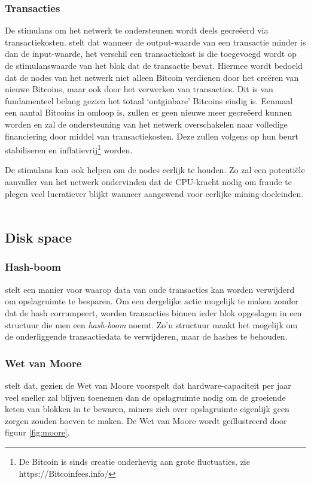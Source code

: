 		\subsubsection{Transacties}
		De stimulans om het netwerk te ondersteunen wordt deels gecreëerd via transactiekosten. \textcite{Nakamoto2008} stelt dat wanneer de output-waarde van een transactie minder is dan de input-waarde, het verschil een transactiekost is die toegevoegd wordt op de stimulanswaarde van het blok dat de transactie bevat. Hiermee wordt bedoeld dat de nodes van het netwerk niet alleen Bitcoin verdienen door het creëren van nieuwe Bitcoins, maar ook door het verwerken van transacties. Dit is van fundamenteel belang gezien het totaal ‘ontginbare’ Bitcoins eindig is. Eenmaal een aantal Bitcoins in omloop is, zullen er geen nieuwe meer gecreëerd kunnen worden en zal de ondersteuning van het netwerk overschakelen naar volledige financiering door middel van transactiekosten. Deze zullen volgens \textcite{Nakamoto2008} op hun beurt stabiliseren en inflatievrij\footnote{De Bitcoin is sinds creatie onderhevig aan grote fluctuaties, zie https://Bitcoinfees.info/} worden.
		
		De stimulans kan ook helpen om de nodes eerlijk te houden. Zo zal een potentiële aanvaller van het netwerk ondervinden dat de CPU-kracht nodig om fraude te plegen veel lucratiever blijkt wanneer aangewend voor eerlijke mining-doeleinden. ~\autocite{Nakamoto2008}
		
	\subsection{Disk space}
		\subsubsection{Hash-boom}
		\textcite{Nakamoto2008} stelt  een manier voor waarop data van oude transacties kan worden verwijderd om opslagruimte te besparen. Om een dergelijke actie mogelijk te maken zonder dat de hash corrumpeert, worden transacties binnen ieder blok opgeslagen in een structuur  die men een \textit{hash-boom} noemt. Zo’n structuur maakt het mogelijk om de onderliggende transactiedata te verwijderen, maar de hashes te behouden. ~\autocite{Nakamoto2008}
		
		\subsubsection{Wet van Moore}	
		\textcite{Nakamoto2008} stelt dat, gezien de Wet van Moore voorspelt dat hardware-capaciteit per jaar veel sneller zal blijven toenemen dan de opslagruimte nodig om de groeiende keten van blokken in te bewaren, miners zich over opslagruimte eigenlijk geen zorgen zouden hoeven te maken. De Wet van Moore wordt geïllustreerd door figuur \ref{fig:moore}.
		
